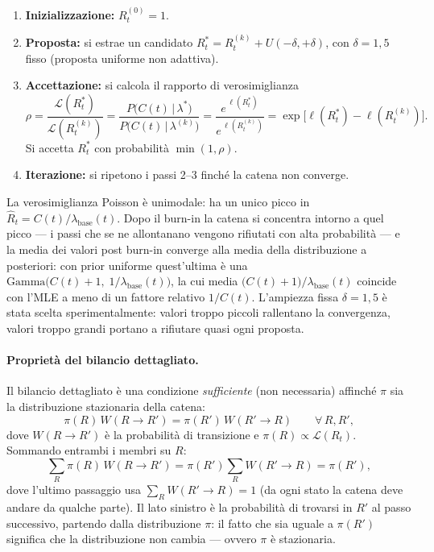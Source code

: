 \documentclass[12pt, a4paper]{article}
\begin{document}
\begin{enumerate}
    \item \textbf{Inizializzazione:} $R_t^{(0)} = 1$.
    \item \textbf{Proposta:} si estrae un candidato
          $R_t^* = R_t^{(k)} + U(-\delta, +\delta)$, con $\delta = 1{,}5$ fisso
          (proposta uniforme non adattiva).
    \item \textbf{Accettazione:} si calcola il rapporto di verosimiglianza
          \begin{equation}
              \rho = \frac{\mathcal{L}(R_t^*)}{\mathcal{L}(R_t^{(k)})}
                   = \frac{P\bigl(C(t)\,\big|\,\lambda^*\bigr)}{P\bigl(C(t)\,\big|\,\lambda^{(k)}\bigr)}
                   = \frac{e^{\,\ell(R_t^*)}}{e^{\,\ell(R_t^{(k)})}}
                   = \exp\!\bigl[\ell(R_t^*) - \ell(R_t^{(k)})\bigr].
              \label{eq:metropolis_ratio}
          \end{equation}
          Si accetta $R_t^*$ con probabilità $\min(1, \rho)$.
    \item \textbf{Iterazione:} si ripetono i passi 2--3 finché la catena non converge.
\end{enumerate}

\noindent
La verosimiglianza Poisson è unimodale: ha un unico picco in $\hat{R}_t = C(t)/\lambda_{\text{base}}(t)$.
Dopo il burn-in la catena si concentra intorno a quel picco --- i passi che se ne allontanano
vengono rifiutati con alta probabilità --- e la media dei valori post burn-in converge alla media
della distribuzione a posteriori: con prior uniforme quest'ultima è una
$\mathrm{Gamma}\bigl(C(t)+1,\; 1/\lambda_{\text{base}}(t)\bigr)$, la cui media
$\bigl(C(t)+1\bigr)/\lambda_{\text{base}}(t)$ coincide con l'MLE a meno di un fattore relativo
$1/C(t)$.
L'ampiezza fissa $\delta = 1{,}5$ è stata scelta sperimentalmente: valori troppo piccoli rallentano
la convergenza, valori troppo grandi portano a rifiutare quasi ogni proposta.

\paragraph{Proprietà del bilancio dettagliato.}
Il bilancio dettagliato è una condizione \emph{sufficiente} (non necessaria) affinché
$\pi$ sia la distribuzione stazionaria della catena:
\begin{equation}
    \pi(R)\, W(R \to R') = \pi(R')\, W(R' \to R) \qquad \forall\, R, R',
    \label{eq:detailed_balance}
\end{equation}
dove $W(R \to R')$ è la probabilità di transizione e $\pi(R) \propto \mathcal{L}(R_t)$.
Sommando entrambi i membri su $R$:
\[
    \sum_R \pi(R)\,W(R \to R') = \pi(R')\sum_R W(R' \to R) = \pi(R'),
\]
dove l'ultimo passaggio usa $\sum_R W(R' \to R) = 1$ (da ogni stato la catena deve
andare da qualche parte). Il lato sinistro è la probabilità di trovarsi in $R'$
al passo successivo, partendo dalla distribuzione $\pi$: il fatto che sia uguale a
$\pi(R')$ significa che la distribuzione non cambia — ovvero $\pi$ è stazionaria.
\end{document}
